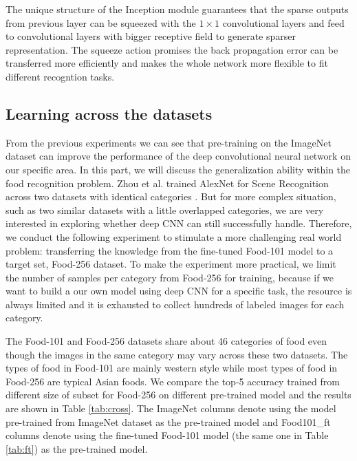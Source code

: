 The unique structure of the Inception module guarantees that the sparse outputs from previous layer can be squeezed with the $1\times 1$ convolutional layers and feed to convolutional layers with bigger receptive field to generate sparser representation. The squeeze action promises the back propagation error can be transferred more efficiently and makes the whole network more flexible to fit different recogntion tasks.

\subsection{Learning across the datasets}
From the previous experiments we can see that pre-training on the ImageNet dataset can improve the performance of the deep convolutional neural network on our specific area. In this part, we will discuss the generalization ability within the food recognition problem.  Zhou et al. trained AlexNet for Scene Recognition across two datasets with identical categories \cite{NIPS2014_Zhou}. But for more complex situation, such as two similar datasets with a little overlapped categories, we are very interested in exploring whether deep CNN can still successfully handle. Therefore, we conduct the following experiment to stimulate a more challenging real world problem: transferring the knowledge from the fine-tuned Food-101 model to a target set, Food-256 dataset. To make the experiment more practical, we limit the number of samples per category from Food-256 for training, because if we want to build a our own model using deep CNN for a specific task, the resource is always limited and it is exhausted to collect hundreds of labeled images for each category.

The Food-101 and Food-256 datasets share about 46 categories of food even though the images in the same category may vary across these two datasets. The types of food in Food-101 are mainly western style while most types of food in Food-256 are typical Asian foods. We compare the top-5 accuracy trained from different size of subset for Food-256 on different pre-trained model and the results are shown in Table \ref{tab:cross}.
The ImageNet columns denote using the model pre-trained from ImageNet dataset as the pre-trained model and Food101\_ft columns denote using the fine-tuned Food-101 model (the same one in Table \ref{tab:ft}) as the pre-trained model.

